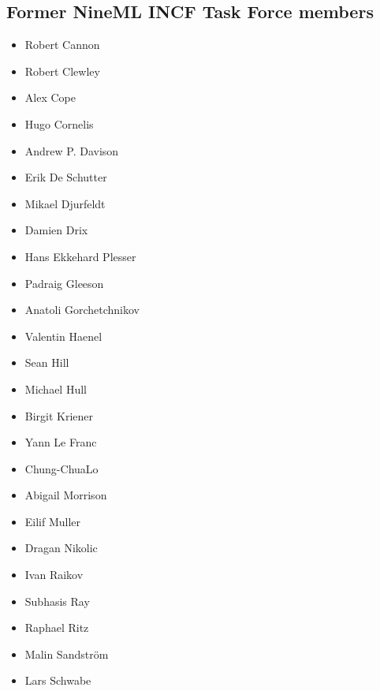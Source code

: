\documentclass[draftspec]{ninemlspec}
\begin{document}
\subsection{Former NineML INCF Task Force members}
\label{sec:task_force}
\begin{multicols}{2}
\begin{itemize}
\item     Robert Cannon
\item     Robert Clewley
\item     Alex Cope
\item     Hugo Cornelis
\item     Andrew P. Davison
\item     Erik De Schutter
\item     Mikael Djurfeldt
\item     Damien Drix
\item     Hans Ekkehard Plesser
\item     Padraig Gleeson
\item     Anatoli Gorchetchnikov
\item     Valentin Haenel
\item     Sean Hill
\item     Michael Hull
\item     Birgit Kriener
\item     Yann Le Franc
\item     Chung-ChuaLo
\item     Abigail Morrison
\item     Eilif Muller
\item     Dragan Nikolic
\item     Ivan Raikov
\item     Subhasis Ray
\item     Raphael Ritz
\item     Malin Sandstr\"{o}m
\item     Lars Schwabe
\end{itemize}
\end{multicols}

\clearpage


\end{document}
